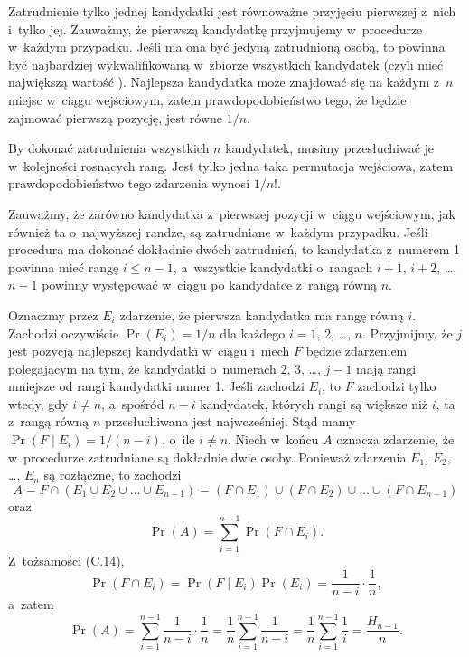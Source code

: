 
\exercise %
Zatrudnienie tylko jednej kandydatki jest równoważne przyjęciu pierwszej z~nich i~tylko jej.
Zauważmy, że pierwszą kandydatkę przyjmujemy w~procedurze  w~każdym przypadku.
Jeśli ma ona być jedyną zatrudnioną osobą, to powinna być najbardziej wykwalifikowaną w~zbiorze wszystkich kandydatek (czyli mieć największą wartość ).
Najlepsza kandydatka może znajdować się na każdym z~$n$ miejsc w~ciągu wejściowym, zatem prawdopodobieństwo tego, że będzie zajmować pierwszą pozycję, jest równe $1/n$.

By dokonać zatrudnienia wszystkich $n$ kandydatek, musimy przesłuchiwać je w~kolejności rosnących rang.
Jest tylko jedna taka permutacja wejściowa, zatem prawdopodobieństwo tego zdarzenia wynosi $1/n!$.

\exercise %
Zauważmy, że zarówno kandydatka z~pierwszej pozycji w~ciągu wejściowym, jak również ta o~najwyższej randze, są zatrudniane w~każdym przypadku.
Jeśli procedura  ma dokonać dokładnie dwóch zatrudnień, to kandydatka z~numerem 1 powinna mieć rangę $i\le n-1$, a~wszystkie kandydatki o~rangach $i+1$, $i+2$, \dots, $n-1$ powinny występować w~ciągu po kandydatce z~rangą równą $n$.

Oznaczmy przez $E_i$ zdarzenie, że pierwsza kandydatka ma rangę równą $i$.
Zachodzi oczywiście $\Pr(E_i)=1/n$ dla każdego $i=1$, 2, \dots, $n$.
Przyjmijmy, że $j$ jest pozycją najlepszej kandydatki w~ciągu i~niech $F$ będzie zdarzeniem polegającym na tym, że kandydatki o~numerach 2, 3, \dots, $j-1$ mają rangi mniejsze od rangi kandydatki numer 1.
Jeśli zachodzi $E_i$, to $F$ zachodzi tylko wtedy, gdy $i\ne n$, a~spośród $n-i$ kandydatek, których rangi są większe niż $i$, ta z~rangą równą $n$ przesłuchiwana jest najwcześniej.
Stąd mamy $\Pr(F\mid E_i)=1/(n-i)$, o~ile $i\ne n$.
Niech w~końcu $A$ oznacza zdarzenie, że w~procedurze  zatrudniane są dokładnie dwie osoby.
Ponieważ zdarzenia $E_1$, $E_2$, \dots, $E_n$ są rozłączne, to zachodzi
\[
	A = F\cap(E_1\cup E_2\cup\dots\cup E_{n-1}) = (F\cap E_1)\cup(F\cap E_2)\cup\dots\cup(F\cap E_{n-1})
\]
oraz
\[
	\Pr(A) = \sum_{i=1}^{n-1}\Pr(F\cap E_i).
\]
Z~tożsamości (C.14),
\[
	\Pr(F\cap E_i) = \Pr(F\mid E_i)\Pr(E_i) = \frac{1}{n-i}\cdot\frac{1}{n},
\]
a~zatem
\[
	\Pr(A) = \sum_{i=1}^{n-1}\frac{1}{n-i}\cdot\frac{1}{n} = \frac{1}{n}\sum_{i=1}^{n-1}\frac{1}{n-i} = \frac{1}{n}\sum_{i=1}^{n-1}\frac{1}{i} = \frac{H_{n-1}}{n}.
\]

